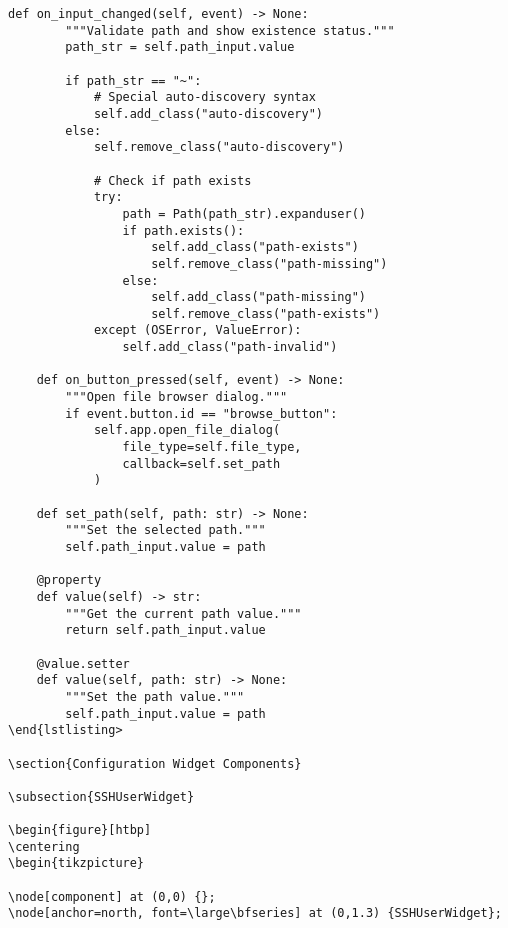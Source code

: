 \documentclass[11pt,a4paper]{article}
\begin{document}
\begin{lstlisting}[caption={ValidatedInput Implementation}]
    def on_input_changed(self, event) -> None:
        """Validate path and show existence status."""
        path_str = self.path_input.value
        
        if path_str == "~":
            # Special auto-discovery syntax
            self.add_class("auto-discovery")
        else:
            self.remove_class("auto-discovery")
            
            # Check if path exists
            try:
                path = Path(path_str).expanduser()
                if path.exists():
                    self.add_class("path-exists")
                    self.remove_class("path-missing")
                else:
                    self.add_class("path-missing")
                    self.remove_class("path-exists")
            except (OSError, ValueError):
                self.add_class("path-invalid")
                
    def on_button_pressed(self, event) -> None:
        """Open file browser dialog."""
        if event.button.id == "browse_button":
            self.app.open_file_dialog(
                file_type=self.file_type,
                callback=self.set_path
            )
            
    def set_path(self, path: str) -> None:
        """Set the selected path."""
        self.path_input.value = path
        
    @property
    def value(self) -> str:
        """Get the current path value."""
        return self.path_input.value
        
    @value.setter
    def value(self, path: str) -> None:
        """Set the path value."""
        self.path_input.value = path
\end{lstlisting>

\section{Configuration Widget Components}

\subsection{SSHUserWidget}

\begin{figure}[htbp]
\centering
\begin{tikzpicture}

\node[component] at (0,0) {};
\node[anchor=north, font=\large\bfseries] at (0,1.3) {SSHUserWidget};


\end{lstlisting}
\end{document}
